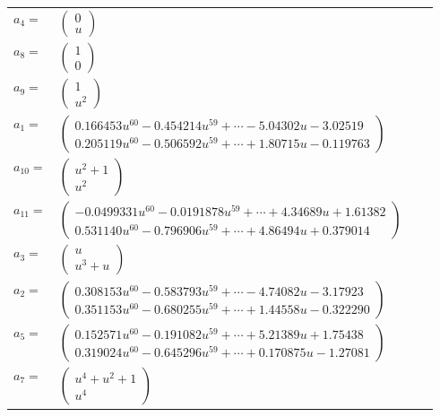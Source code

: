 \documentclass[1p]{elsarticle_modified}
\theoremstyle{definition}
\begin{document}
\begin{tabular}{m{7pt} m{180pt} m{7pt} m{180pt} }
\flushright $a_{4}=$&$\begin{pmatrix}0\\u\end{pmatrix}$ \\
\flushright $a_{8}=$&$\begin{pmatrix}1\\0\end{pmatrix}$ \\
\flushright $a_{9}=$&$\begin{pmatrix}1\\u^2\end{pmatrix}$ \\
\flushright $a_{1}=$&$\begin{pmatrix}0.166453 u^{60}-0.454214 u^{59}+\cdots-5.04302 u-3.02519\\0.205119 u^{60}-0.506592 u^{59}+\cdots+1.80715 u-0.119763\end{pmatrix}$ \\
\flushright $a_{10}=$&$\begin{pmatrix}u^2+1\\u^2\end{pmatrix}$ \\
\flushright $a_{11}=$&$\begin{pmatrix}-0.0499331 u^{60}-0.0191878 u^{59}+\cdots+4.34689 u+1.61382\\0.531140 u^{60}-0.796906 u^{59}+\cdots+4.86494 u+0.379014\end{pmatrix}$ \\
\flushright $a_{3}=$&$\begin{pmatrix}u\\u^3+u\end{pmatrix}$ \\
\flushright $a_{2}=$&$\begin{pmatrix}0.308153 u^{60}-0.583793 u^{59}+\cdots-4.74082 u-3.17923\\0.351153 u^{60}-0.680255 u^{59}+\cdots+1.44558 u-0.322290\end{pmatrix}$ \\
\flushright $a_{5}=$&$\begin{pmatrix}0.152571 u^{60}-0.191082 u^{59}+\cdots+5.21389 u+1.75438\\0.319024 u^{60}-0.645296 u^{59}+\cdots+0.170875 u-1.27081\end{pmatrix}$ \\
\flushright $a_{7}=$&$\begin{pmatrix}u^4+u^2+1\\u^4\end{pmatrix}$ \\

\end{tabular}
\end{document}

